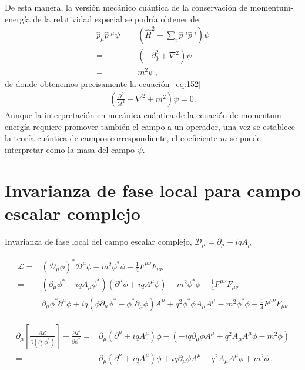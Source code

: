 De esta manera, la versión mecánico cuántica de la conservación de momentum-energía de la relatividad especial se podría obtener de
\begin{align}
  \widehat{p}_{\mu}\widehat{p}\;^{\mu}\psi=&\left( \widehat{H}^{2}-\sum_{i}\widehat{p}\;^i\widehat{p}\;^i \right)\psi \nonumber\\
=&\left( -\partial_0^2+\nabla^2 \right)\psi \nonumber\\
=& m^2 \psi\,,
\end{align}
de donde obtenemos precisamente la ecuación~\eqref{eq:152}
\begin{align}
  \left(
\frac{\partial^2}{\partial t^2}-\nabla^2+m^2
  \right)\psi=0.
\end{align}
Aunque la interpretación en mecánica cuántica de la ecuación de momentum-energía requiere promover también el campo a un operador, una vez se establece la teoría cuántica de campos correspondiente, el coeficiente $m$ se puede interpretar como la masa del campo $\psi$.


\section{Invarianza de fase local para campo escalar complejo}

Invarianza de fase local del campo escalar complejo, $\mathcal{D}_{\mu}=\partial_{\mu}+iq A_{\mu}$

\begin{align}
  \mathcal{L}=& \left( \mathcal{D}_{\mu} \phi \right)^{*} \mathcal{D}^{\mu}\phi -m^2 \phi^{*}\phi-\frac{1}{4}F^{\mu\nu}F_{\mu\nu} \nonumber\\
             =&\left( \partial_{\mu}\phi^{*}-iq A_{\mu} \phi^{*} \right)\left( \partial^{\mu}\phi+iq A^{\mu} \phi \right) -m^2 \phi^{*}\phi-\frac{1}{4}F^{\mu\nu}F_{\mu\nu} \nonumber\\
              =&\partial_{\mu}\phi^{*}\partial^{\mu}\phi+iq \left(\phi\partial_{\mu}\phi^{*} -\phi^{*}\partial_{\mu}\phi \right) A^{\mu} +q^2 \phi^{*}\phi A_{\mu} A^{\mu} -m^2 \phi^{*}\phi-\frac{1}{4}F^{\mu\nu}F_{\mu\nu} 
\end{align}

\begin{align}
  \partial_{\mu} \left[ \frac{\partial \mathcal{L}}{\partial \left( \partial_{\mu}\phi^{*} \right)} \right]-\frac{\partial \mathcal{L}}{\partial \phi^{*}}
=&\partial_{\mu} \left( \partial^{\mu}+iq A^{\mu} \right)\phi -\left(-iq \partial_{\mu}\phi A^{\mu} +q^2 A_{\mu}A^{\mu}\phi-m^{2}\phi  \right) \nonumber\\
 =&\partial_{\mu} \left( \partial^{\mu}+iq A^{\mu} \right)\phi  +iq \partial_{\mu}\phi A^{\mu}-q^2 A_{\mu}A^{\mu}\phi+m^{2}\phi\,.
\end{align}

